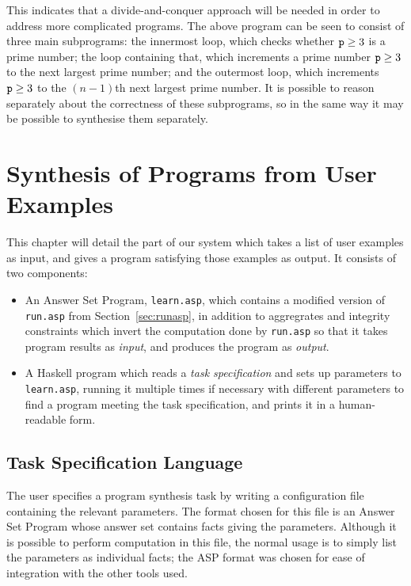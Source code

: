 \documentclass[a4paper,twoside,notitlepage]{report}
\begin{document}
This indicates that a divide-and-conquer approach will be needed in order 
to address more complicated programs. The above program can be seen to 
consist of three main subprograms: the innermost loop, which checks 
whether $\verb|p|\geq3$ is a prime number; the loop containing that, which 
increments a prime number $\verb|p|\geq3$ to the next largest prime 
number; and the outermost loop, which increments $\verb|p|\geq3$ to the 
$(n-1)$th next largest prime number. It is possible to reason separately 
about the correctness of these subprograms, so in the same way it may be 
possible to synthesise them separately.

\chapter{Synthesis of Programs from User Examples} \label{chp:synexm}

This chapter will detail the part of our system which takes a list of user 
examples as input, and gives a program satisfying those examples as 
output. It consists of two components:
\begin{itemize}
    \item An Answer Set Program, \verb|learn.asp|, which contains a 
    modified version of \verb|run.asp| from Section~\ref{sec:runasp}, in 
    addition to aggregrates and integrity constraints which invert the 
    computation done by \verb|run.asp| so that it takes program results as 
    \emph{input}, and produces the program as \emph{output}.

    \item A Haskell program which reads a \emph{task specification} and 
    sets up parameters to \verb|learn.asp|, running it multiple times if 
    necessary with different parameters to find a program meeting the task 
    specification, and prints it in a human-readable form.
\end{itemize}

\section{Task Specification Language} \label{sec:spclng}
The user specifies a program synthesis task by writing a configuration file 
containing the relevant parameters. The format chosen for this file is an 
Answer Set Program whose answer set contains facts giving the parameters. 
Although it is possible to perform computation in this file, the normal usage 
is to simply list the parameters as individual facts; the ASP format was 
chosen for ease of integration with the other tools used.
\end{document}
